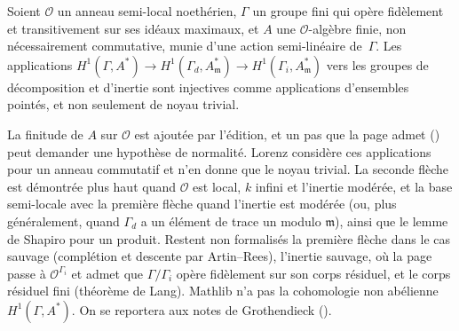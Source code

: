 \begin{encadre}
\begin{theoreme*}\nonverifie
Soient $\mathcal O$ un anneau semi-local noethérien, $\Gamma$ un groupe fini qui opère fidèlement et transitivement sur ses idéaux maximaux, et $A$ une $\mathcal O$-algèbre finie, non nécessairement commutative, munie d'une action semi-linéaire de~$\Gamma$. Les applications $H^1(\Gamma, A^*) \to H^1(\Gamma_d, A_{\mathfrak m}^*) \to H^1(\Gamma_i, A_{\mathfrak m}^*)$ vers les groupes de décomposition et d'inertie sont injectives comme applications d'ensembles pointés, et non seulement de noyau trivial.
\end{theoreme*}
\end{encadre}
{\small La finitude de $A$ sur $\mathcal O$ est ajoutée par l'édition, et un pas que la page admet () peut demander une hypothèse de normalité. Lorenz considère ces applications pour un anneau commutatif et n'en donne que le noyau trivial. La seconde flèche est démontrée plus haut quand $\mathcal O$ est local, $k$ infini et l'inertie modérée, et la base semi-locale avec la première flèche quand l'inertie est modérée (ou, plus généralement, quand $\Gamma_d$ a un élément de trace un modulo $\mathfrak m$), ainsi que le lemme de Shapiro pour un produit. Restent non formalisés la première flèche dans le cas sauvage (complétion et descente par Artin--Rees), l'inertie sauvage, où la page passe à $\mathcal O^{\Gamma_i}$ et admet que $\Gamma/\Gamma_i$ opère fidèlement sur son corps résiduel, et le corps résiduel fini (théorème de Lang). Mathlib n'a pas la cohomologie non abélienne $H^1(\Gamma, A^*)$. On se reportera aux notes de Grothendieck ().\par}
